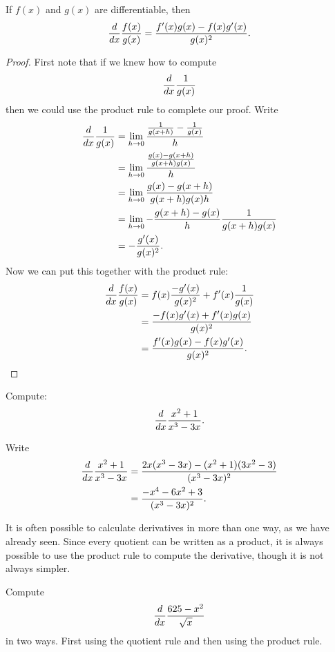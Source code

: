 \begin{mainTheorem}\label{theorem:quotient-rule}
If $f(x)$ and $g(x)$ are differentiable, then
\[
\frac{d}{dx} \frac{f(x)}{g(x)} = \frac{f'(x)g(x)-f(x)g'(x)}{g(x)^2}.
\]
\end{mainTheorem}
\begin{proof}
First note that if we knew how to compute
\[
\frac{d}{dx} \frac{1}{g(x)}
\]
then we could use the product rule to complete our proof.  Write
\begin{align*}
\frac{d}{dx}\frac{1}{g(x)}&=\lim_{h\to0} \frac{\frac{1}{g(x+h)}-\frac{1}{g(x)}}{h} \\
&=\lim_{h\to0} \frac{\frac{g(x)-g(x+h)}{g(x+h)g(x)}}{h} \\
&=\lim_{h\to0} \frac{g(x)-g(x+h)}{g(x+h)g(x)h} \\
&=\lim_{h\to0} -\frac{g(x+h)-g(x)}{h} \frac{1}{g(x+h)g(x)} \\
&=-\frac{g'(x)}{g(x)^2}.
\end{align*}
Now we can put this together with the product rule:
\begin{align*}
\frac{d}{dx}\frac{f(x)}{g(x)} &=f(x)\frac{-g'(x)}{g(x)^2}+f'(x)\frac{1}{g(x)}\\
&=\frac{-f(x)g'(x)+f'(x)g(x)}{g(x)^2}\\
&=\frac{f'(x)g(x)-f(x)g'(x)}{g(x)^2}.
\end{align*}

\end{proof}


\begin{example}
Compute:
\[
\frac{d}{dx} \frac{x^2+1}{x^3-3x}.
\]
\end{example}

\begin{solution}
Write
\begin{align*}
\frac{d}{dx} \frac{x^2+1}{x^3-3x} &= \frac{2x(x^3-3x)-(x^2+1)(3x^2-3)}{(x^3-3x)^2}\\
&=\frac{-x^4-6x^2+3}{(x^3-3x)^2}.
\end{align*}
\end{solution}

It is often possible to calculate derivatives in more than one way, as
we have already seen. Since every quotient can be written as a
product, it is always possible to use the product rule to compute the
derivative, though it is not always simpler.

\begin{example}
Compute 
\[
\frac{d}{dx} \frac{625-x^2}{\sqrt{x}}
\] 
in two ways. First using the quotient rule and then using the product
rule.
\end{example}

